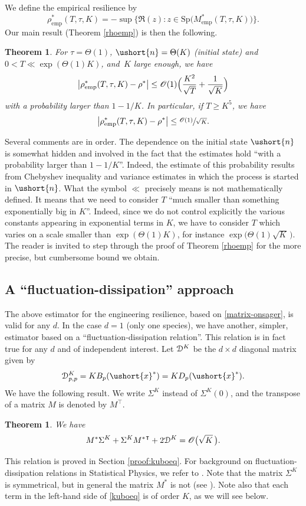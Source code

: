 \documentclass[11pt]{article}
\newcommand{\emp}{\mathrm{emp}}
\let\mathcal\mathscr
\numberwithin{equation}{section}
\theoremstyle{plain}
\newtheorem{theorem}{Theorem}[section]
\newtheorem*{theorem*}{Theorem}
\theoremstyle{definition}
\newcommand{\Oun}{\mathcal{O}(1)}
\newcommand{\Thetaun}{\Theta(1)}
\newcommand{\sK}{K}
\newcommand{\Sp}{\mathrm{Sp}}
\newcommand{\vecn}{\ushort{n}}
\newcommand{\vecxf}{\ushort{x}^*}
\newcommand{\res}{\rho^*}
\begin{document}
We define the empirical resilience by
\[
\rho^*_\emp(T,\tau,K)=
- \sup\big\{ \Re (z): z\in\Sp\bigl(M^{*}_\emp(T,\tau,K)\bigr)\big\}.
\]
Our main result (Theorem \ref{rhoemp}) is then the following.
\begin{theorem*}
For $\tau=\Theta(1)$, $\vecn=\Theta(K)$ (initial state) and $0<T\ll \exp(\Thetaun K)$,
and~$K$ large enough, we have
\[
\big|\rho^*_\emp(T,\tau,K)-\res\big|\le
\Oun \Bigl(\frac{K^2}{\sqrt{T}} +\frac{1}{\sqrt{K}}\Bigr)
\]
with a probability larger than $1-1/K$. In particular, if $T\geq K^5$, we have
\[
\big|\rho^*_\emp(T,\tau,K)-\res\big|\leq \sfrac{\Oun}{\sqrt{K}}.
\]
\end{theorem*}
Several comments are in order.
The dependence on the initial state $\vecn$ is somewhat hidden and involved in the fact that the estimates hold ``with a probability larger than $1-1/K$''.
Indeed, the estimate of this probability results from Chebyshev inequality and variance estimates in which the process is started in
$\vecn$.
What the symbol $\ll$ precisely means is not mathematically defined. It means that we need to consider $T$ ``much smaller than
something exponentially big in $K$''. Indeed, since we do not control explicitly the various constants appearing in exponential terms in $K$, we have to
consider $T$ which varies on a scale smaller than $\exp(\Theta(1)K)$, for instance $\exp\bigl(\Theta(1)\sqrt{K}\,\bigr)$. The
reader is invited to step through the proof of Theorem \ref{rhoemp} for the more precise, but cumbersome bound we obtain.

\subsection{A ``fluctuation-dissipation'' approach}

The above estimator for the engineering resilience, based on \eqref{matrix-onsager}, is valid for any $d$.
In the case $d=1$ (only one species), we have another, simpler, estimator based on a ``fluctuation-dissipation relation''.
This relation is in fact true for any $d$ and of independent interest.
Let $\EuScript{D}^{\sK}$ be the $d\times d$ diagonal matrix given by
\[
\EuScript{D}^{\sK}_{p,p}=K B_{p}(\vecxf)=K D_{p}(\vecxf).
\]
We have the following result. We write $\Sigma^{\sK}$ instead of $\Sigma^{\sK}(0)$, and the transpose of a matrix $M$ is denoted
by $M^{\intercal}$.
\begin{theorem}\label{thm-Kubo}
We have
\begin{equation}\label{kuboeq}
M^*\Sigma^{\sK}+\Sigma^{\sK}{M^*}^{\intercal}+2\EuScript{D}^{\sK}=\mathcal{O}\bigl(\sqrt{K}\,\bigr).
\end{equation}
\end{theorem}
This relation is proved in Section \ref{proof:kuboeq}. For background on fluctuation-dissipation relations in Statistical
Physics, we refer to \cite[\S\S 2-3]{kubo}. Note that the matrix $\Sigma^{\sK}$ is symmetrical, but in general the matrix
$M^*$ is not (see
\cite{ccm2}). Note also that each term in the left-hand side of \eqref{kuboeq} is of order $K$, as we will see below.
\end{document}
